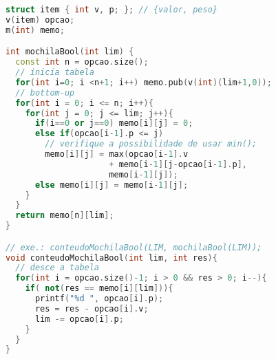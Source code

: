 \begin{lstlisting}[language=c++, title=Itens acabam]
struct item { int v, p; }; // {valor, peso}
v(item) opcao;
m(int) memo;

int mochilaBool(int lim) { 
  const int n = opcao.size();
  // inicia tabela
  for(int i=0; i <n+1; i++) memo.pub(v(int)(lim+1,0));
  // bottom-up
  for(int i = 0; i <= n; i++){ 
    for(int j = 0; j <= lim; j++){ 
      if(i==0 or j==0) memo[i][j] = 0; 
      else if(opcao[i-1].p <= j) 
        // verifique a possibilidade de usar min();
        memo[i][j] = max(opcao[i-1].v
                     + memo[i-1][j-opcao[i-1].p], 
                     memo[i-1][j]); 
      else memo[i][j] = memo[i-1][j]; 
    } 
  } 
  return memo[n][lim]; 
}

// exe.: conteudoMochilaBool(LIM, mochilaBool(LIM));
void conteudoMochilaBool(int lim, int res){
  // desce a tabela 
  for(int i = opcao.size()-1; i > 0 && res > 0; i--){ 
    if( not(res == memo[i][lim])){ 
      printf("%d ", opcao[i].p); 
      res = res - opcao[i].v; 
      lim -= opcao[i].p; 
    } 
  } 
} 


\end{lstlisting}